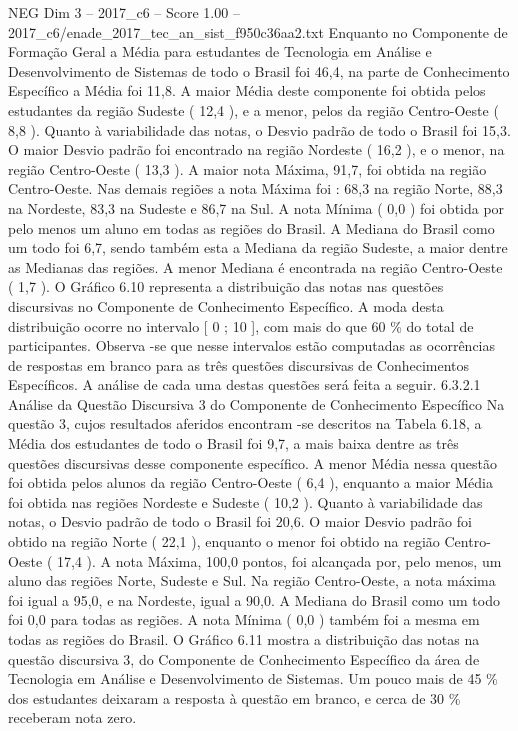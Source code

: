 \begin{textsample}{NEG Dim 3 – 2017\_c6 – Score 1.00 – 2017\_c6/enade\_2017\_tec\_an\_sist\_f950c36aa2.txt}
Enquanto no Componente de Formação Geral a Média para estudantes de Tecnologia em Análise e Desenvolvimento de Sistemas de todo o Brasil foi 46,4, na parte de Conhecimento Específico a Média foi 11,8.
A maior Média deste componente foi obtida pelos estudantes da região Sudeste ( 12,4 ), e a menor, pelos da região Centro-Oeste ( 8,8 ).
Quanto à variabilidade das notas, o Desvio padrão de todo o Brasil foi 15,3.
O maior Desvio padrão foi encontrado na região Nordeste ( 16,2 ), e o menor, na região Centro-Oeste ( 13,3 ).
A maior nota Máxima, 91,7, foi obtida na região Centro-Oeste.
Nas demais regiões a nota Máxima foi : 68,3 na região Norte, 88,3 na Nordeste, 83,3 na Sudeste e 86,7 na Sul.
A nota Mínima ( 0,0 ) foi obtida por pelo menos um aluno em todas as regiões do Brasil.
A Mediana do Brasil como um todo foi 6,7, sendo também esta a Mediana da região Sudeste, a maior dentre as Medianas das regiões.
A menor Mediana é encontrada na região Centro-Oeste ( 1,7 ).
O Gráfico 6.10 representa a distribuição das notas nas questões discursivas no Componente de Conhecimento Específico.
A moda desta distribuição ocorre no intervalo [ 0 ; 10 ], com mais do que 60 \% do total de participantes.
Observa -se que nesse intervalos estão computadas as ocorrências de respostas em branco para as três questões discursivas de Conhecimentos Específicos.
A análise de cada uma destas questões será feita a seguir. 6.3.2.1 Análise da Questão Discursiva 3 do Componente de Conhecimento Específico Na questão 3, cujos resultados aferidos encontram -se descritos na Tabela 6.18, a Média dos estudantes de todo o Brasil foi 9,7, a mais baixa dentre as três questões discursivas desse componente específico.
A menor Média nessa questão foi obtida pelos alunos da região Centro-Oeste ( 6,4 ), enquanto a maior Média foi obtida nas regiões Nordeste e Sudeste ( 10,2 ).
Quanto à variabilidade das notas, o Desvio padrão de todo o Brasil foi 20,6.
O maior Desvio padrão foi obtido na região Norte ( 22,1 ), enquanto o menor foi obtido na região Centro-Oeste ( 17,4 ).
A nota Máxima, 100,0 pontos, foi alcançada por, pelo menos, um aluno das regiões Norte, Sudeste e Sul.
Na região Centro-Oeste, a nota máxima foi igual a 95,0, e na Nordeste, igual a 90,0.
A Mediana do Brasil como um todo foi 0,0 para todas as regiões.
A nota Mínima ( 0,0 ) também foi a mesma em todas as regiões do Brasil.
O Gráfico 6.11 mostra a distribuição das notas na questão discursiva 3, do Componente de Conhecimento Específico da área de Tecnologia em Análise e Desenvolvimento de Sistemas.
Um pouco mais de 45 \% dos estudantes deixaram a resposta à questão em branco, e cerca de 30 \% receberam nota zero.

\end{textsample}

